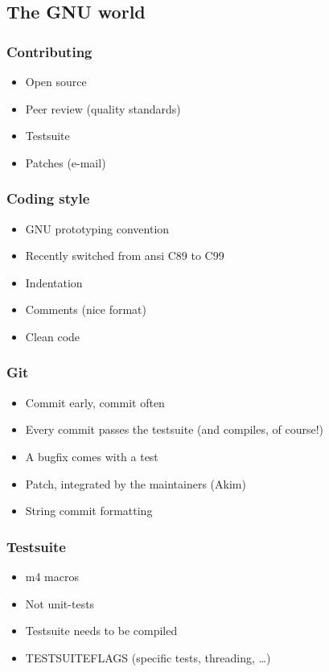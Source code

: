 \documentclass{beamer}
\begin{document}
\subsection{The GNU world}

\begin{frame}
  \frametitle{Contributing}
    \begin{itemize}
      \item Open source
      \item Peer review (quality standards)
      \item Testsuite
      \item Patches (e-mail)
    \end{itemize}
\end{frame}

\begin{frame}
  \frametitle{Coding style}
    \begin{itemize}
      \item GNU prototyping convention
      \item Recently switched from ansi C89 to C99
      \item Indentation
      \item Comments (nice format)
      \item Clean code
    \end{itemize}
\end{frame}

\begin{frame}
  \frametitle{Git}
    \begin{itemize}
      \item Commit early, commit often
      \item Every commit passes the testsuite (and compiles, of course!)
      \item A bugfix comes with a test
      \item Patch, integrated by the maintainers (Akim)
      \item String commit formatting
    \end{itemize}
\end{frame}

\begin{frame}
  \frametitle{Testsuite}
    \begin{itemize}
      \item m4 macros
      \item Not unit-tests
      \item Testsuite needs to be compiled
      \item TESTSUITEFLAGS (specific tests, threading, \ldots)
    \end{itemize}
\end{frame}
\end{document}
